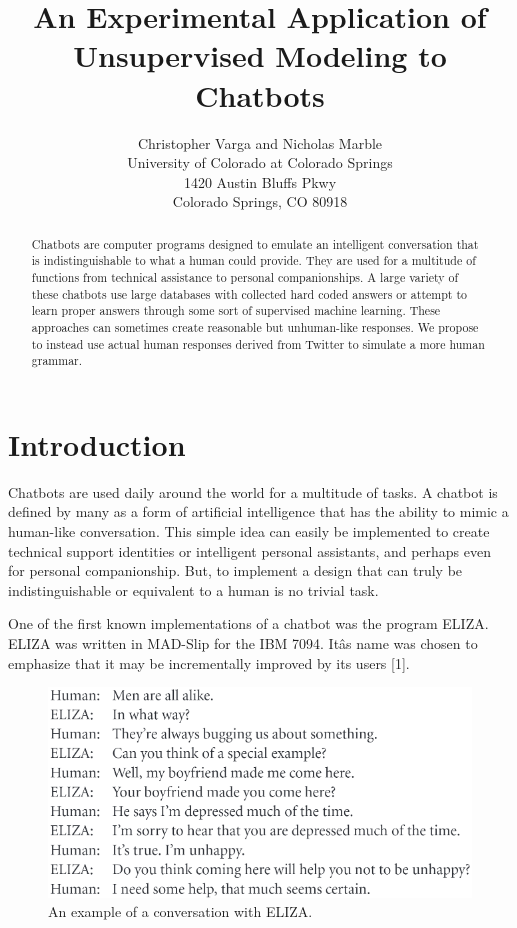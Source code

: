 \documentclass[letterpaper]{article} %
\begin{document}
%
\title{An Experimental Application of Unsupervised Modeling to Chatbots}
\author{Christopher Varga and Nicholas Marble\\
University of Colorado at Colorado Springs\\
1420 Austin Bluffs Pkwy\\
Colorado Springs, CO 80918\\
}

\maketitle
\begin{abstract}
Chatbots are computer programs designed to emulate an intelligent conversation that is indistinguishable to what a human could provide. They are used for a multitude of functions from technical assistance to personal companionships. A large variety of these chatbots use large databases with collected hard coded answers or attempt to learn proper answers through some sort of supervised machine learning. These approaches can sometimes create reasonable but unhuman-like responses. We propose to instead use actual human responses derived from Twitter to simulate a more human grammar.
\end{abstract}

\section{Introduction}
\noindent Chatbots are used daily around the world for a multitude of tasks. A chatbot is defined by many as a form of artificial intelligence that has the ability to mimic a human-like conversation. This simple idea can easily be implemented to create technical support identities or intelligent personal assistants, and perhaps even for personal companionship. But, to implement a design that can truly be indistinguishable or equivalent to a human is no trivial task.

One of the first known implementations of a chatbot was the program ELIZA. ELIZA was written in MAD-Slip for the IBM 7094. Itâs name was chosen to emphasize that it may be incrementally improved by its users [1].

\begin{figure}[h]
\centering
\includegraphics[width=.3\textwidth]{ELIZAExample.PNG}
\caption{\label{fig:eliza_example}An example of a conversation with ELIZA.}
\end{figure}
\end{document}
